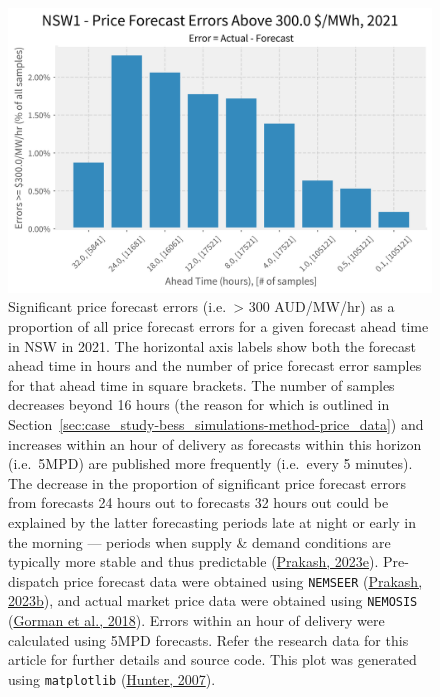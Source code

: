 \documentclass[12pt,a4paper,]{report}
\begin{document}
\begin{figure}
\hypertarget{fig:nsw_significant_price_error_counts}{%
\centering
\includegraphics{source/figures/NSW1_percent_above_300.0_2021.png}
\caption{Significant price forecast errors (i.e.~\textgreater{} 300
AUD/MW/hr) as a proportion of all price forecast errors for a given
forecast ahead time in NSW in 2021. The horizontal axis labels show both
the forecast ahead time in hours and the number of price forecast error
samples for that ahead time in square brackets. The number of samples
decreases beyond 16 hours (the reason for which is outlined in
Section~\ref{sec:case_study-bess_simulations-method-price_data}) and
increases within an hour of delivery as forecasts within this horizon
(i.e.~5MPD) are published more frequently (i.e.~every 5 minutes). The
decrease in the proportion of significant price forecast errors from
forecasts 24 hours out to forecasts 32 hours out could be explained by
the latter forecasting periods late at night or early in the morning ---
periods when supply \& demand conditions are typically more stable and
thus predictable
(\protect\hyperlink{ref-prakashLookingPredispatchDemand2023}{Prakash,
2023e}). Pre-dispatch price forecast data were obtained using
\texttt{NEMSEER} (\protect\hyperlink{ref-prakashNEMSEER2023}{Prakash,
2023b}), and actual market price data were obtained using
\texttt{NEMOSIS}
(\protect\hyperlink{ref-gormanNEMOSISNEMOpen2018}{Gorman et al., 2018}).
Errors within an hour of delivery were calculated using 5MPD forecasts.
Refer the research data for this article for further details and source
code. This plot was generated using \texttt{matplotlib}
(\protect\hyperlink{ref-hunterMatplotlib2DGraphics2007}{Hunter,
2007}).}\label{fig:nsw_significant_price_error_counts}
}
\end{figure}
\end{document}

